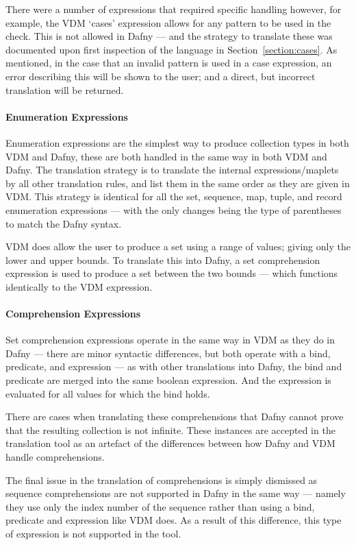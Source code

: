 \documentclass{entcs}
\begin{document}
There were a number of expressions that required specific handling however, for example, the VDM `cases' expression allows for any pattern to be used in the check. This is not allowed in Dafny --- and the strategy to translate these was documented upon first inspection of the language in Section~\ref{section:cases}. As mentioned, in the case that an invalid pattern is used in a case expression, an error describing this will be shown to the user; and a direct, but incorrect translation will be returned.

\paragraph{Enumeration Expressions}

Enumeration expressions are the simplest way to produce collection types in both VDM and Dafny, these are both handled in the same way in both VDM and Dafny. The translation strategy is to translate the internal expressions/maplets by all other translation rules, and list them in the same order as they are given in VDM. This strategy is identical for all the set, sequence, map, tuple, and record enumeration expressions --- with the only changes being the type of parentheses to match the Dafny syntax.

VDM does allow the user to produce a set using a range of values; giving only the lower and upper bounds. To translate this into Dafny, a set comprehension expression is used to produce a set between the two bounds --- which functions identically to the VDM expression.

\paragraph{Comprehension Expressions}
Set comprehension expressions operate in the same way in VDM as they do in Dafny --- there are minor syntactic differences, but both operate with a bind, predicate, and expression --- as with other translations into Dafny, the bind and predicate are merged into the same boolean expression. And the expression is evaluated for all values for which the bind holds. 

There are cases when translating these comprehensions that Dafny cannot prove that the resulting collection is not infinite. These instances are accepted in the translation tool as an artefact of the differences between how Dafny and VDM handle comprehensions.

The final issue in the translation of comprehensions is simply dismissed as sequence comprehensions are not supported in Dafny in the same way --- namely they use only the index number of the sequence rather than using a bind, predicate and expression like VDM does. As a result of this difference, this type of expression is not supported in the tool.
\end{document}
